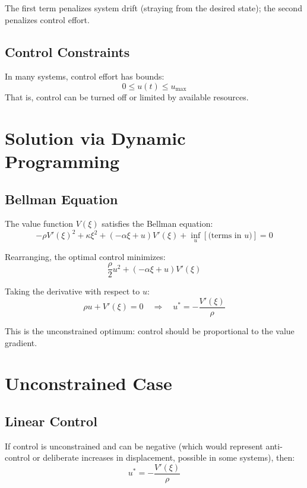 \documentclass[12pt]{article}
\begin{document}
The first term penalizes system drift (straying from the desired state); the second penalizes control effort.

\subsection{Control Constraints}

In many systems, control effort has bounds:
\begin{equation}
0 \leq u(t) \leq u_{\max}
\end{equation}
That is, control can be turned off or limited by available resources.

\section{Solution via Dynamic Programming}

\subsection{Bellman Equation}

The value function $V(\xi)$ satisfies the Bellman equation:
\begin{equation}
-\rho V'(\xi)^2 + \kappa \xi^2 + (-\alpha \xi + u) V'(\xi) + \inf_u \left[ \text{(terms in $u$)} \right] = 0
\end{equation}

Rearranging, the optimal control minimizes:
\begin{equation}
\frac{\rho}{2} u^2 + (-\alpha \xi + u) V'(\xi)
\end{equation}

Taking the derivative with respect to $u$:
\begin{equation}
\rho u + V'(\xi) = 0 \quad \Rightarrow \quad u^* = -\frac{V'(\xi)}{\rho}
\end{equation}

This is the unconstrained optimum: control should be proportional to the value gradient.

\section{Unconstrained Case}

\subsection{Linear Control}

If control is unconstrained and can be negative (which would represent anti-control or deliberate increases in displacement, possible in some systems), then:
\begin{equation}
u^* = -\frac{V'(\xi)}{\rho}
\end{equation}
\end{document}
